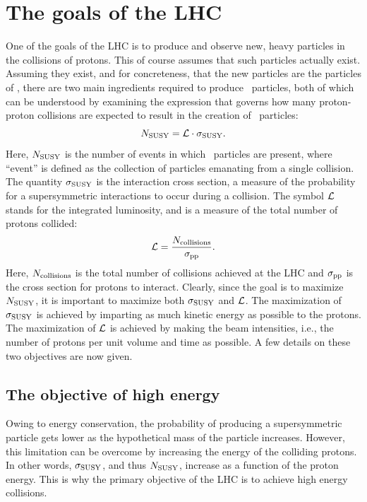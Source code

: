 \section{The goals of the LHC}
One of the goals of the LHC is to produce and observe new, heavy particles in the collisions of protons. This of course assumes that such particles actually exist. Assuming they exist, and for concreteness, that the new particles are the particles of \SUSY, there are two main ingredients required to produce \susy~particles, both of which can be understood by examining the expression that governs how many proton-proton collisions are expected to result in the creation of \susy~particles:
\begin{equation}
N_{\rm SUSY} = \mathcal{L}\cdot \sigma_{\rm SUSY}.
\end{equation}
Here, $N_{\rm SUSY}$ is the number of events in which \susy~particles are present, where ``event'' is defined as the collection of particles emanating from a single collision. The quantity $\sigma_{\rm SUSY}$ is the interaction cross section, a measure of the probability for a supersymmetric interactions to occur during a collision. The symbol $\mathcal{L}$ stands for the integrated luminosity, and is a measure of the total number of protons collided:
\begin{equation}
\mathcal{L} = \frac{N_{\rm collisions}}{\sigma_{\rm pp}}.
\end{equation} 
Here, $N_{\rm collisions}$ is the total number of collisions achieved at the LHC and $\sigma_{\rm pp}$ is the cross section for protons to interact. Clearly, since the goal is to maximize $N_{\rm SUSY}$, it is important to maximize both $\sigma_{\rm SUSY}$ and $\mathcal{L}$. The maximization of $\sigma_{\rm SUSY}$ is achieved by imparting as much kinetic energy as possible to the protons.  The maximization of $\mathcal{L}$ is achieved by making the beam intensities, i.e., the number of protons per unit volume and time as possible. A few details on these two objectives are now given.

\subsection{The objective of high energy}

Owing to energy conservation, the probability of producing a supersymmetric particle gets lower as the hypothetical mass of the particle increases.  However, this limitation can be overcome by increasing the energy of the colliding protons. In other words, $\sigma_{\rm SUSY}$, and thus $N_{\rm SUSY}$, increase as a function of the proton energy. This is why the primary objective of the LHC is to achieve high energy collisions.


